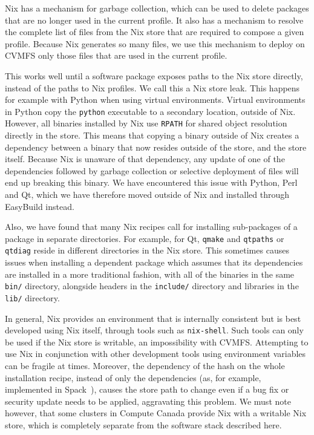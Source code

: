 \documentclass[sigconf]{acmart}
\begin{document}
Nix has a mechanism for garbage collection, which can be used to delete packages that are no longer used in the current profile. It also has a mechanism to resolve the complete list of files from the Nix store that are required to compose a given profile. Because Nix generates so many files, we use this mechanism to deploy on CVMFS only those files that are used in the current profile. 

This works well until a software package exposes paths to the Nix store directly, instead of the paths to Nix profiles. We call this a Nix store leak. This happens for example with Python when using virtual environments. Virtual environments in Python copy the \texttt{python} executable to a secondary location, outside of Nix. However, all binaries installed by Nix use \texttt{RPATH} for shared object resolution directly in the store. This means that copying a binary outside of Nix creates a dependency between a binary that now resides outside of the store, and the store itself. Because Nix is unaware of that dependency, any update of one of the dependencies followed by garbage collection or selective deployment of files will end up breaking this binary. We have encountered this issue with Python, Perl and Qt, which we have therefore moved outside of Nix and installed through EasyBuild instead.

Also, we have found that many Nix recipes call for installing sub-packages of a package in separate directories. For example, for Qt, \texttt{qmake} and \texttt{qtpaths} or \texttt{qtdiag} reside in different directories in the Nix store. This sometimes causes issues when installing a dependent package which assumes that its dependencies are installed in a more traditional fashion, with all of the binaries in the same \texttt{bin/} directory, alongside headers in the \texttt{include/} directory and libraries in the \texttt{lib/} directory.

In general, Nix provides an environment that is internally consistent but is best developed using Nix itself, through tools such as \texttt{nix-shell}. Such tools can only be used if the Nix store is writable, an impossibility with CVMFS. Attempting to use Nix in conjunction with other development tools using environment variables can be fragile at times. Moreover, the dependency of the hash on the whole installation recipe, instead of only the dependencies (as, for example, implemented in Spack~\cite{Spack}), causes the store path to change even if a bug fix or security update needs to be applied, aggravating this problem. We must note however, that some clusters in Compute Canada provide Nix with a writable Nix store, which is completely separate from the software stack described here.
\end{document}
